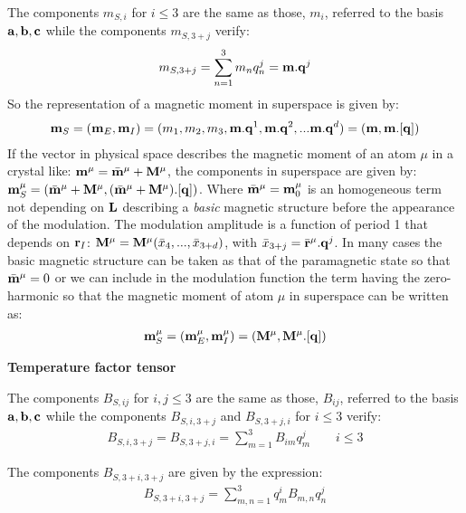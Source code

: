 \documentclass[10pt]{article}
\begin{document}
The components $m_{S,i}$ for $i \leq 3$ are the same as those, $m_{i}$, referred to the basis ${\bf a}, {\bf b}, {\bf c}$ while the components $m_{S,3+j}$   verify:
\begin{eqnarray} 
m_{S,3+j} = \sum_{n=1}^{3} m_{n} q_n^j = {\bf m}.{\bf q}^j   
\end{eqnarray}
So the representation of a magnetic moment in superspace is given by:
\begin{eqnarray} 
{\bf m}_{S} = ({\bf m}_{E}, {\bf m}_{I}) = (m_1,m_2,m_3,{\bf m}.{\bf q}^1, {\bf m}.{\bf q}^2, ... {\bf m}.{\bf q}^d ) = ({\bf m},{\bf m}.[{\bf q}])
\end{eqnarray}
If the vector in physical space describes the magnetic moment of an atom $\mu$ in a crystal like: $ {\bf m}^\mu =  \bar{\bf m}^\mu + {\bf M}^\mu $, the components in superspace are given by: $ {\bf m}_S^\mu =  (\bar{\bf m}^\mu+ {\bf M}^\mu , (\bar{\bf m}^\mu + {\bf M}^\mu).[{\bf q}]) $. Where $\bar{\bf m}^\mu={\bf m}_0^\mu $ is an homogeneous term not depending on ${\bf L}$ describing a {\it basic} magnetic structure before the appearance of the modulation. The modulation amplitude is a function of period 1 that depends on ${\bf r}_I$: ${\bf M}^\mu={\bf M}^\mu(\bar x_4,...,\bar x_{3+d})$, with $\bar x_{3+j}=\bar{\bf r}^\mu.{\bf q}^j$. In many cases the basic magnetic structure can be taken as that of the paramagnetic state so that $\bar{\bf m}^\mu=0$ or we can include in the modulation function the term having the zero-harmonic so that the magnetic moment of atom $\mu$ in superspace can be written as:
\begin{eqnarray} 
\label{super_mom}
{\bf m}_{S}^\mu =  ({\bf m}_{E}^\mu, {\bf m}_{I}^\mu) = ({\bf M}^\mu, {\bf M}^\mu .[{\bf q}]) 
\end{eqnarray}

{\bf  Temperature factor tensor }

The components $B_{S,ij}$ for $i,j \leq 3$ are the same as those, $B_{ij}$, referred to the basis ${\bf a}, {\bf b}, {\bf c}$ while the components $B_{S,i,3+j}$ and $B_{S,3+j,i}$ for $i \leq 3$  verify:
\begin{eqnarray} 
B_{S,i,3+j} = B_{S,3+j,i} =\sum_{m=1}^{3} B_{im} q_m^j  \qquad  i \leq 3  
\end{eqnarray}

The components $B_{S,3+i,3+j}$ are given by the expression:
\begin{eqnarray} 
B_{S,3+i,3+j} = \sum_{m,n=1}^{3} q_m^i B_{m,n} q_n^j  
\end{eqnarray}
 
\end{document}
